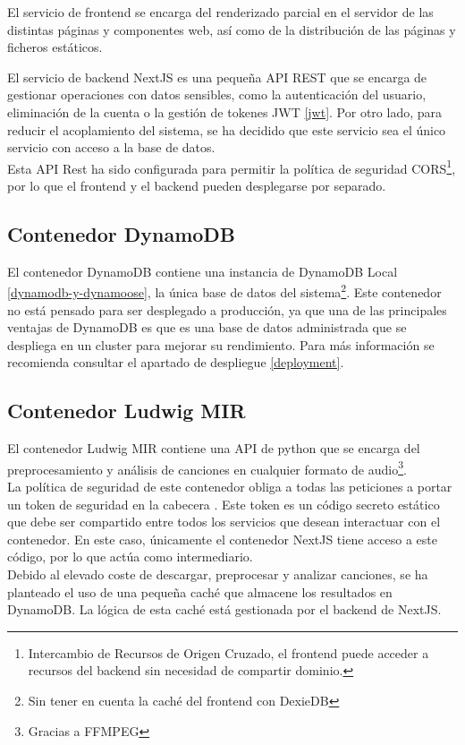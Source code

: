El servicio de frontend se encarga del renderizado parcial en el servidor de las distintas páginas y componentes web, así como de la distribución de las páginas y ficheros estáticos.

El servicio de backend NextJS es una pequeña API REST que se encarga de gestionar operaciones con datos sensibles, como la autenticación del usuario, eliminación de la cuenta o la gestión de tokenes JWT \ref{jwt}. Por otro lado, para reducir el acoplamiento del sistema, se ha decidido que este servicio sea el único servicio con acceso a la base de datos.\\
Esta API Rest ha sido configurada para permitir la política de seguridad CORS\footnote{Intercambio de Recursos de Origen Cruzado, el frontend puede acceder a recursos del backend sin necesidad de compartir dominio.}, por lo que el frontend y el backend pueden desplegarse por separado.


\subsection{Contenedor DynamoDB}
El contenedor DynamoDB contiene una instancia de DynamoDB Local \ref{dynamodb-y-dynamoose}, la única base de datos del sistema\footnote{Sin tener en cuenta la caché del frontend con DexieDB}. 
Este contenedor no está pensado para ser desplegado a producción, ya que una de las principales ventajas de DynamoDB es que es una base de datos administrada que se despliega en un cluster para mejorar su rendimiento. Para más información se recomienda consultar el apartado de despliegue \ref{deployment}.

\subsection{Contenedor Ludwig MIR}
El contenedor Ludwig MIR contiene una API de python que se encarga del preprocesamiento y análisis de canciones en cualquier formato de audio\footnote{Gracias a FFMPEG}.\\
La política de seguridad de este contenedor obliga a todas las peticiones a portar un token de seguridad en la cabecera  . Este token es un código secreto estático que debe ser compartido entre todos los servicios que desean interactuar con el contenedor. En este caso, únicamente el contenedor NextJS tiene acceso a este código, por lo que actúa como intermediario.\\
Debido al elevado coste de descargar, preprocesar y analizar canciones, se ha planteado el uso de una pequeña caché que almacene los resultados en DynamoDB. La lógica de esta caché está gestionada por el backend de NextJS.


